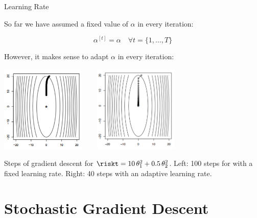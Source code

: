 \begin{vbframe}{Learning Rate}


So far we have assumed a fixed value of $\alpha$ in every iteration:

\vspace*{-0.2cm}
$$\alpha^{[t]} = \alpha \quad \forall t = {\{1, \ldots, T\}}$$

%
%

However, it makes sense to adapt $\alpha$ in every iteration:


\vspace*{-0.1cm}
\begin{center}
\includegraphics[width = 0.3\textwidth]{plots/stepsize_small.png} ~~~ \includegraphics[width = 0.3\textwidth]{plots/stepsize_adaptive.png} \\
\begin{footnotesize}
Steps of gradient descent for $\riskt = 10\,\theta_1^2 + 0.5\,\theta_2^2$. Left:  100 steps for with a fixed learning rate. Right:  40 steps with an adaptive learning rate.
\end{footnotesize}
\end{center}

\end{vbframe}


\section{Stochastic Gradient Descent}


